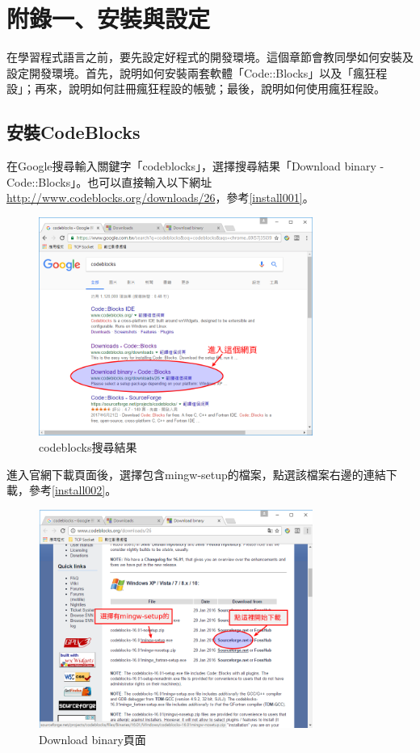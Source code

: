 
\section{附錄一、安裝與設定}

在學習程式語言之前，要先設定好程式的開發環境。這個章節會教同學如何安裝及設定開發環境。首先，說明如何安裝兩套軟體「Code::Blocks」以及「瘋狂程設」；再來，說明如何註冊瘋狂程設的帳號；最後，說明如何使用瘋狂程設。

\subsection{安裝CodeBlocks}
	在Google搜尋輸入關鍵字「codeblocks」，選擇搜尋結果「Download binary - Code::Blocks」。也可以直接輸入以下網址 \url{http://www.codeblocks.org/downloads/26}，參考\autoref{install001}。
	\begin{figure}[H]
		\centering
		\includegraphics[width=0.8\textwidth]{fig/install_and_setting/install_001_searchCodeblocks}
		\caption{codeblocks搜尋結果}
		\label{install001}
	\end{figure}

\newpage
	進入官網下載頁面後，選擇包含mingw-setup的檔案，點選該檔案右邊的連結下載，參考\autoref{install002}。
	\begin{figure}[H]
		\centering
		\includegraphics[width=0.8\textwidth]{fig/install_and_setting/install_002_Download_binary}
		\caption{Download binary頁面}
		\label{install002}
	\end{figure}
	
